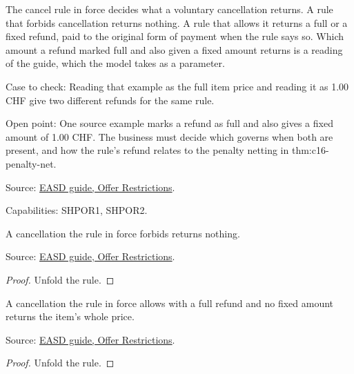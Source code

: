 \begin{definition}
  \label{def:offers-refund-on-cancellation}
  The cancel rule in force decides what a voluntary cancellation returns. A
  rule that forbids cancellation returns nothing. A rule that allows it
  returns a full or a fixed refund, paid to the original form of payment
  when the rule says so. Which amount a refund marked full and also given a
  fixed amount returns is a reading of the guide, which the model takes as
  a parameter.

  Case to check: Reading that example as the full item price and reading it
  as 1.00 CHF give two different refunds for the same rule.

  Open point: One source example marks a refund as full and also gives a
  fixed amount of 1.00 CHF. The business must decide which governs when both
  are present, and how the rule's refund relates to the penalty netting in
  thm:c16-penalty-net.

  Source: \href{https://standards.atlassian.net/wiki/spaces/EASD/pages/574259692/Offer+Restrictions}{EASD guide, Offer Restrictions}.

  Capabilities: SHPOR1, SHPOR2.
\end{definition}

\begin{theorem}
  \label{thm:offers-cancel-forbidden}
  A cancellation the rule in force forbids returns nothing.

  Source: \href{https://standards.atlassian.net/wiki/spaces/EASD/pages/574259692/Offer+Restrictions}{EASD guide, Offer Restrictions}.
\end{theorem}
\begin{proof}
  Unfold the rule.
\end{proof}

\begin{theorem}
  \label{thm:offers-cancel-full}
  A cancellation the rule in force allows with a full refund and no fixed
  amount returns the item's whole price.

  Source: \href{https://standards.atlassian.net/wiki/spaces/EASD/pages/574259692/Offer+Restrictions}{EASD guide, Offer Restrictions}.
\end{theorem}
\begin{proof}
  Unfold the rule.
\end{proof}

